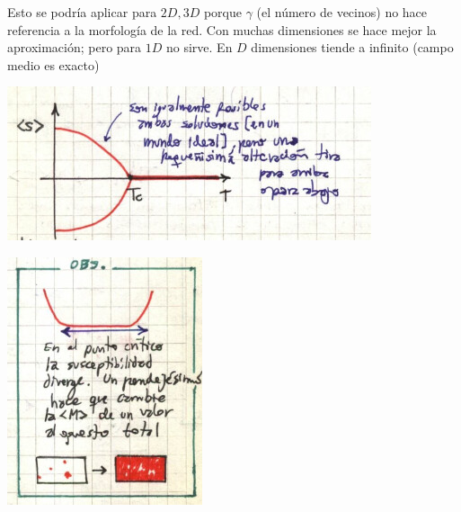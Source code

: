 \documentclass[10pt,oneside]{CBFT_book}
\begin{document}
Esto se podría aplicar para $2D, 3D$ porque $\gamma$ (el número de vecinos) no hace referencia a la morfología
de la red.
Con muchas dimensiones se hace mejor la aproximación; pero para $1D$ no sirve. En $D$ dimensiones tiende
a infinito (campo medio es exacto)

\includegraphics[scale=0.5]{images/1606337163.jpg}

\includegraphics[scale=0.5]{images/1606337167.jpg}
\end{document}
